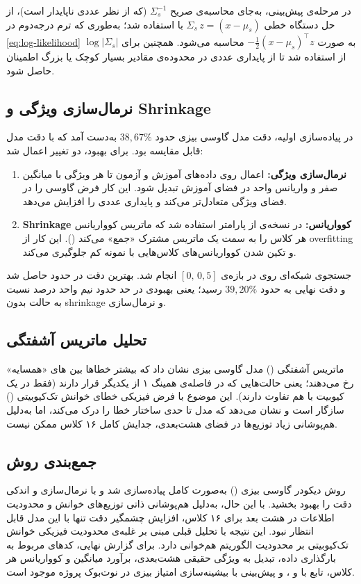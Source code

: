 در مرحله‌ی پیش‌بینی، به‌جای محاسبه‌ی صریح $\Sigma_s^{-1}$ (که از نظر عددی ناپایدار است)، از حل دستگاه خطی $\Sigma_s \, z = (x - \mu_s)$ با  استفاده شد؛ به‌طوری که ترم درجه‌دوم در \eqref{eq:log-likelihood} به صورت $-\frac{1}{2}(x - \mu_s)^\top z$ محاسبه می‌شود. همچنین برای $\log |\Sigma_s|$ از  استفاده شد تا از پایداری عددی در محدوده‌ی مقادیر بسیار کوچک یا بزرگ اطمینان حاصل شود.

\subsection{نرمال‌سازی ویژگی و Shrinkage}
در پیاده‌سازی اولیه، دقت مدل گاوسی بیزی حدود $38{,}67\%$ به‌دست آمد که با دقت مدل  قابل مقایسه بود. برای بهبود، دو تغییر اعمال شد:
\begin{enumerate}
	\item \textbf{نرمال‌سازی ویژگی:} اعمال  روی داده‌های آموزش و آزمون تا هر ویژگی با میانگین صفر و واریانس واحد در فضای آموزش تبدیل شود. این کار فرض گاوسی را در فضای ویژگی متعادل‌تر می‌کند و پایداری عددی را افزایش می‌دهد.
	\item \textbf{Shrinkage کوواریانس:} در نسخه‌ی  از پارامتر  استفاده شد که ماتریس کوواریانس هر کلاس را به سمت یک ماتریس مشترک «جمع» می‌کند (). این کار از overfitting و تکین شدن کوواریانس‌های کلاس‌هایی با نمونه کم جلوگیری می‌کند.
\end{enumerate}
جستجوی شبکه‌ای روی  در بازه‌ی $[0,\, 0{,}5]$ انجام شد. بهترین دقت در حدود  حاصل شد و دقت نهایی به حدود $39{,}20\%$ رسید؛ یعنی بهبودی در حد حدود نیم واحد درصد نسبت به حالت بدون shrinkage و نرمال‌سازی.

\subsection{تحلیل ماتریس آشفتگی}
ماتریس آشفتگی () مدل گاوسی بیزی نشان داد که بیشتر خطاها بین های «همسایه» رخ می‌دهند؛ یعنی حالت‌هایی که در فاصله‌ی همینگ ۱ از یکدیگر قرار دارند (فقط در یک کیوبیت با هم تفاوت دارند). این موضوع با فرض فیزیکی خطای خوانش تک‌کیوبیتی () سازگار است و نشان می‌دهد که مدل تا حدی ساختار خطا را درک می‌کند، اما به‌دلیل هم‌پوشانی زیاد توزیع‌ها در فضای هشت‌بعدی، جدایش کامل ۱۶ کلاس ممکن نیست.

\subsection{جمع‌بندی روش}
روش دیکودر گاوسی بیزی () به‌صورت کامل پیاده‌سازی شد و با نرمال‌سازی و  اندکی دقت را بهبود بخشید. با این حال، به‌دلیل هم‌پوشانی ذاتی توزیع‌های خوانش و محدودیت اطلاعات در هشت بعد برای ۱۶ کلاس، افزایش چشمگیر دقت تنها با این مدل قابل انتظار نبود. این نتیجه با تحلیل قبلی مبنی بر غلبه‌ی محدودیت فیزیکی خوانش تک‌کیوبیتی بر محدودیت الگوریتم هم‌خوانی دارد. برای گزارش نهایی، کدهای مربوط به بارگذاری داده، تبدیل به ویژگی حقیقی هشت‌بعدی، برآورد میانگین و کوواریانس هر کلاس، تابع  با  و ، و پیش‌بینی با بیشینه‌سازی امتیاز بیزی در نوت‌بوک پروژه موجود است.



